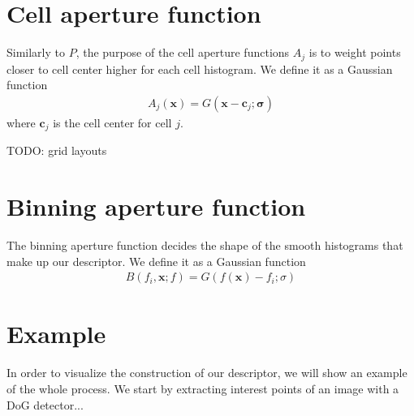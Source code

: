\documentclass[thesis.tex]{subfiles}
\def\x{\mathbf{x}}
\def\c{\mathbf{c}}
\begin{document}
\section{Cell aperture function}
%
Similarly to $P$, the purpose of the cell aperture functions $A_j$ is to weight points closer to cell center higher for each cell histogram. We define it as a Gaussian function
%
\begin{align}
A_j(\x) = G(\x - \c_j; \boldsymbol{\sigma})
\end{align}
%
where $\c_j$ is the cell center for cell $j$.

TODO: grid layouts
%
\section{Binning aperture function}
%
The binning aperture function decides the shape of the smooth histograms that make up our descriptor. We define it as a Gaussian function
%
\begin{align}
B(f_i, \x; f) = G(f(\x) - f_i; \sigma)
\end{align}
%
\section{Example}
%
In order to visualize the construction of our descriptor, we will show an example of the whole process. We start by extracting interest points of an image with a DoG detector...
%
\end{document}
